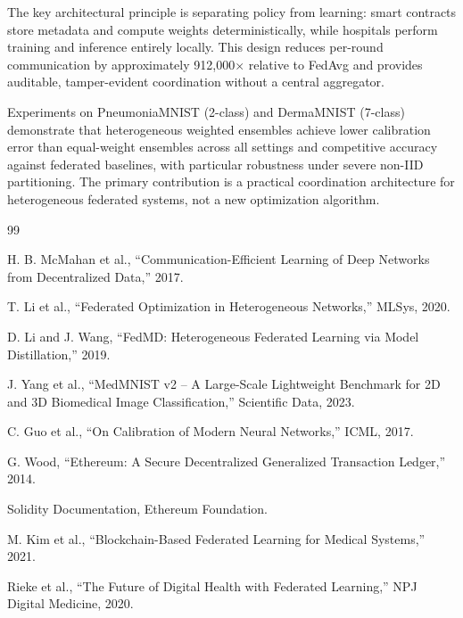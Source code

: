 \documentclass[conference]{IEEEtran}
\begin{document}
The key architectural principle is separating policy from learning: smart contracts store metadata and compute weights deterministically, while hospitals perform training and inference entirely locally. This design reduces per-round communication by approximately 912,000$\times$ relative to FedAvg and provides auditable, tamper-evident coordination without a central aggregator.

Experiments on PneumoniaMNIST (2-class) and DermaMNIST (7-class) demonstrate that heterogeneous weighted ensembles achieve lower calibration error than equal-weight ensembles across all settings and competitive accuracy against federated baselines, with particular robustness under severe non-IID partitioning. The primary contribution is a practical coordination architecture for heterogeneous federated systems, not a new optimization algorithm.

\begin{thebibliography}{99}

H. B. McMahan et al., ``Communication-Efficient Learning of Deep Networks from Decentralized Data,'' 2017.

T. Li et al., ``Federated Optimization in Heterogeneous Networks,'' MLSys, 2020.

D. Li and J. Wang, ``FedMD: Heterogeneous Federated Learning via Model Distillation,'' 2019.

J. Yang et al., ``MedMNIST v2 -- A Large-Scale Lightweight Benchmark for 2D and 3D Biomedical Image Classification,'' Scientific Data, 2023.

C. Guo et al., ``On Calibration of Modern Neural Networks,'' ICML, 2017.

G. Wood, ``Ethereum: A Secure Decentralized Generalized Transaction Ledger,'' 2014.

Solidity Documentation, Ethereum Foundation.

M. Kim et al., ``Blockchain-Based Federated Learning for Medical Systems,'' 2021.

Rieke et al., ``The Future of Digital Health with Federated Learning,'' NPJ Digital Medicine, 2020.

\end{thebibliography}
\end{document}
